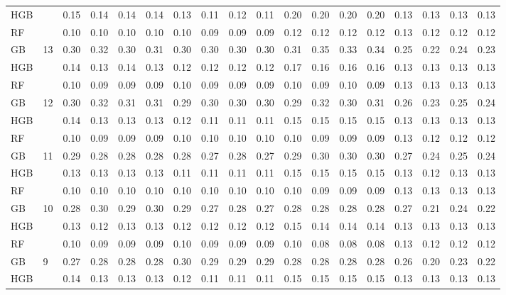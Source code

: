 \documentclass{IEEEtran}
\begin{document}
\begin{table}[th]
\begin{adjustbox}{width=\textwidth}
\begin{tabular}{| l | l | rrrr | rrrr | rrrr | rrrr |}
HGB &   & 0.15 & 0.14 & 0.14 & 0.14 & 0.13 & 0.11 & 0.12 & 0.11 & 0.20 & 0.20 & 0.20 & 0.20 & 0.13 & 0.13 & 0.13 & 0.13 \\
RF &   & 0.10 & 0.10 & 0.10 & 0.10 & 0.10 & 0.09 & 0.09 & 0.09 & 0.12 & 0.12 & 0.12 & 0.12 & 0.13 & 0.12 & 0.12 & 0.12 \\ \hline
GB & \multirow{3}{*}{13} & 0.30 & 0.32 & 0.30 & 0.31 & 0.30 & 0.30 & 0.30 & 0.30 & 0.31 & 0.35 & 0.33 & 0.34 & 0.25 & 0.22 & 0.24 & 0.23 \\
HGB &   & 0.14 & 0.13 & 0.14 & 0.13 & 0.12 & 0.12 & 0.12 & 0.12 & 0.17 & 0.16 & 0.16 & 0.16 & 0.13 & 0.13 & 0.13 & 0.13 \\
RF &   & 0.10 & 0.09 & 0.09 & 0.09 & 0.10 & 0.09 & 0.09 & 0.09 & 0.10 & 0.09 & 0.10 & 0.09 & 0.13 & 0.13 & 0.13 & 0.13 \\ \hline
GB & \multirow{3}{*}{12} & 0.30 & 0.32 & 0.31 & 0.31 & 0.29 & 0.30 & 0.30 & 0.30 & 0.29 & 0.32 & 0.30 & 0.31 & 0.26 & 0.23 & 0.25 & 0.24 \\
HGB &   & 0.14 & 0.13 & 0.13 & 0.13 & 0.12 & 0.11 & 0.11 & 0.11 & 0.15 & 0.15 & 0.15 & 0.15 & 0.13 & 0.13 & 0.13 & 0.13 \\
RF &   & 0.10 & 0.09 & 0.09 & 0.09 & 0.10 & 0.10 & 0.10 & 0.10 & 0.10 & 0.09 & 0.09 & 0.09 & 0.13 & 0.12 & 0.12 & 0.12 \\ \hline
GB & \multirow{3}{*}{11} & 0.29 & 0.28 & 0.28 & 0.28 & 0.28 & 0.27 & 0.28 & 0.27 & 0.29 & 0.30 & 0.30 & 0.30 & 0.27 & 0.24 & 0.25 & 0.24 \\
HGB &   & 0.13 & 0.13 & 0.13 & 0.13 & 0.11 & 0.11 & 0.11 & 0.11 & 0.15 & 0.15 & 0.15 & 0.15 & 0.13 & 0.12 & 0.13 & 0.13 \\
RF &   & 0.10 & 0.10 & 0.10 & 0.10 & 0.10 & 0.10 & 0.10 & 0.10 & 0.10 & 0.09 & 0.09 & 0.09 & 0.13 & 0.13 & 0.13 & 0.13 \\ \hline
GB & \multirow{3}{*}{10} & 0.28 & 0.30 & 0.29 & 0.30 & 0.29 & 0.27 & 0.28 & 0.27 & 0.28 & 0.28 & 0.28 & 0.28 & 0.27 & 0.21 & 0.24 & 0.22 \\
HGB &   & 0.13 & 0.12 & 0.13 & 0.13 & 0.12 & 0.12 & 0.12 & 0.12 & 0.15 & 0.14 & 0.14 & 0.14 & 0.13 & 0.13 & 0.13 & 0.13 \\
RF &   & 0.10 & 0.09 & 0.09 & 0.09 & 0.10 & 0.09 & 0.09 & 0.09 & 0.10 & 0.08 & 0.08 & 0.08 & 0.13 & 0.12 & 0.12 & 0.12 \\ \hline
GB & \multirow{3}{*}{9} & 0.27 & 0.28 & 0.28 & 0.28 & 0.30 & 0.29 & 0.29 & 0.29 & 0.28 & 0.28 & 0.28 & 0.28 & 0.26 & 0.20 & 0.23 & 0.22 \\
HGB &   & 0.14 & 0.13 & 0.13 & 0.13 & 0.12 & 0.11 & 0.11 & 0.11 & 0.15 & 0.15 & 0.15 & 0.15 & 0.13 & 0.13 & 0.13 & 0.13 \\

\end{tabular}
\end{adjustbox}
\end{table}
\end{document}
